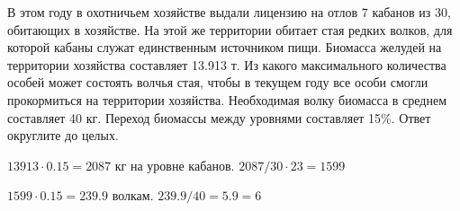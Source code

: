 
В этом году в охотничьем хозяйстве выдали лицензию на отлов 7 кабанов из 30, 
обитающих в хозяйстве. На этой же территории обитает стая редких волков, для 
которой кабаны служат единственным источником пищи. Биомасса желудей на территории 
хозяйства составляет 13.913 т. Из какого максимального количества особей может состоять волчья 
стая, чтобы в текущем году все особи смогли прокормиться на территории хозяйства. 
Необходимая волку биомасса в среднем составляет 40 кг. Переход биомассы между уровнями составляет 15\%. 
Ответ округлите до целых.

\solutionSection

$13913 \cdot 0.15=2087$ кг на уровне кабанов. $2087/30 \cdot 23 = 1599$   

$1599 \cdot 0.15=239.9$ волкам. $239.9/40 = 5.9 = 6$

